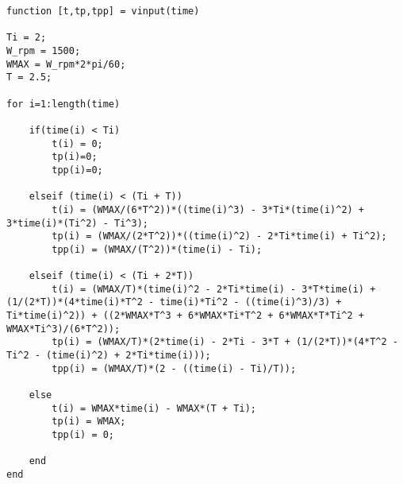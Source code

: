 \begin{lstlisting}
function [t,tp,tpp] = vinput(time)

Ti = 2;
W_rpm = 1500;
WMAX = W_rpm*2*pi/60;
T = 2.5;

for i=1:length(time)
    
    if(time(i) < Ti)   
    	t(i) = 0;
    	tp(i)=0;
    	tpp(i)=0;
    
    elseif (time(i) < (Ti + T)) 
    	t(i) = (WMAX/(6*T^2))*((time(i)^3) - 3*Ti*(time(i)^2) + 3*time(i)*(Ti^2) - Ti^3);
    	tp(i) = (WMAX/(2*T^2))*((time(i)^2) - 2*Ti*time(i) + Ti^2);
    	tpp(i) = (WMAX/(T^2))*(time(i) - Ti);
    
    elseif (time(i) < (Ti + 2*T))
    	t(i) = (WMAX/T)*(time(i)^2 - 2*Ti*time(i) - 3*T*time(i) + (1/(2*T))*(4*time(i)*T^2 - time(i)*Ti^2 - ((time(i)^3)/3) + Ti*time(i)^2)) + ((2*WMAX*T^3 + 6*WMAX*Ti*T^2 + 6*WMAX*T*Ti^2 + WMAX*Ti^3)/(6*T^2));  
    	tp(i) = (WMAX/T)*(2*time(i) - 2*Ti - 3*T + (1/(2*T))*(4*T^2 - Ti^2 - (time(i)^2) + 2*Ti*time(i)));
    	tpp(i) = (WMAX/T)*(2 - ((time(i) - Ti)/T));
    
    else
    	t(i) = WMAX*time(i) - WMAX*(T + Ti);
    	tp(i) = WMAX;
    	tpp(i) = 0;
    
    end
end
\end{lstlisting}

